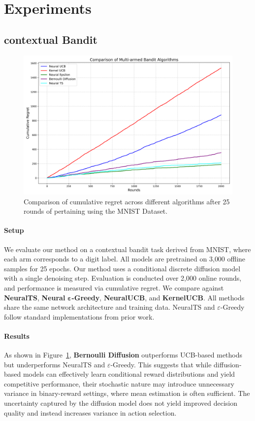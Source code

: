 \section{Experiments} \label{sec:4_experiments}




\subsection{contextual Bandit}

\begin{figure}[H]
    \centering
    \includegraphics[width=0.9\linewidth]{Img/context_compare.png}
    \caption{Comparison of cumulative regret across different algorithms after 25 rounds of pertaining using the MNIST Dataset.}
    \label{fig:context_regret}
\end{figure}

\paragraph{Setup}
We evaluate our method on a contextual bandit task derived from MNIST, where each arm corresponds to a digit label. 
All models are pretrained on 3{,}000 offline samples for 25 epochs. Our method uses a conditional discrete diffusion model with a single denoising step. Evaluation is conducted over 2{,}000 online rounds, and performance is measured via cumulative regret.
We compare against \textbf{NeuralTS}, \textbf{Neural} $\boldsymbol{\varepsilon}$\textbf{-Greedy}, \textbf{NeuralUCB}, and \textbf{KernelUCB}. All methods share the same network architecture and training data. NeuralTS and $\varepsilon$-Greedy follow standard implementations from prior work.

\paragraph{Results}
As shown in Figure~\ref{fig:context_regret}, \textbf{Bernoulli Diffusion} outperforms UCB-based methods but underperforms NeuralTS and $\varepsilon$-Greedy. This suggests that while diffusion-based models can effectively learn conditional reward distributions and yield competitive performance, their stochastic nature may introduce unnecessary variance in binary-reward settings, where mean estimation is often sufficient. 
The uncertainty captured by the diffusion model does not yield improved decision quality and instead increases variance in action selection.


